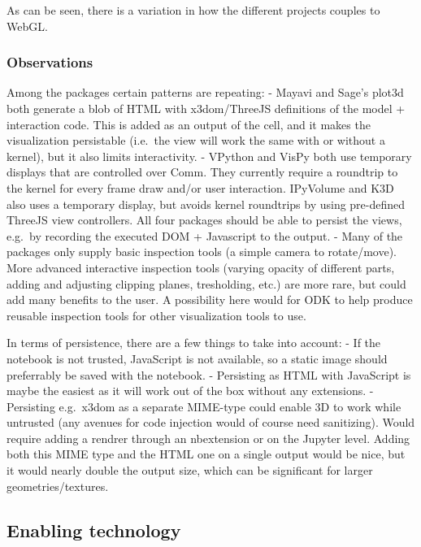 As can be seen, there is a variation in how the different projects
couples to WebGL.

    \hypertarget{observations}{%
\subsubsection{Observations}\label{observations}}

Among the packages certain patterns are repeating: - Mayavi and Sage's
plot3d both generate a blob of HTML with x3dom/ThreeJS definitions of
the model + interaction code. This is added as an output of the cell,
and it makes the visualization persistable (i.e.~the view will work the
same with or without a kernel), but it also limits interactivity. -
VPython and VisPy both use temporary displays that are controlled over
Comm. They currently require a roundtrip to the kernel for every frame
draw and/or user interaction. IPyVolume and K3D also uses a temporary
display, but avoids kernel roundtrips by using pre-defined ThreeJS view
controllers. All four packages should be able to persist the views,
e.g.~by recording the executed DOM + Javascript to the output. - Many of
the packages only supply basic inspection tools (a simple camera to
rotate/move). More advanced interactive inspection tools (varying
opacity of different parts, adding and adjusting clipping planes,
tresholding, etc.) are more rare, but could add many benefits to the
user. A possibility here would for ODK to help produce reusable
inspection tools for other visualization tools to use.

In terms of persistence, there are a few things to take into account: -
If the notebook is not trusted, JavaScript is not available, so a static
image should preferrably be saved with the notebook. - Persisting as
HTML with JavaScript is maybe the easiest as it will work out of the box
without any extensions. - Persisting e.g.~x3dom as a separate MIME-type
could enable 3D to work while untrusted (any avenues for code injection
would of course need sanitizing). Would require adding a rendrer through
an nbextension or on the Jupyter level. Adding both this MIME type and
the HTML one on a single output would be nice, but it would nearly
double the output size, which can be significant for larger
geometries/textures.

    \hypertarget{enabling-technology}{%
\subsection{Enabling technology}\label{enabling-technology}}

